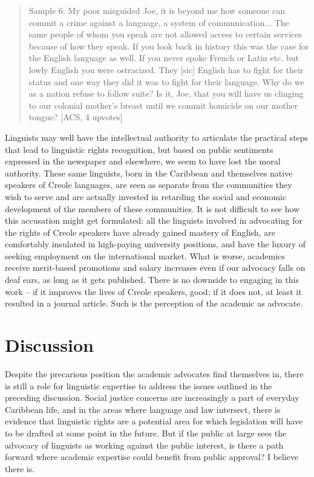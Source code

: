 \documentclass[output=paper,colorlinks,citecolor=brown]{langscibook}
\begin{document}
\begin{quote}
    Sample 6: My poor misguided Joe, it is beyond me how someone can commit a crime against a language, a system of communication... The same people of whom you speak are not allowed access to certain services because of how they speak. If you look back in history this was the case for the English language as well. If you never spoke French or Latin etc. but lowly English you were ostracized. They [sic] English has to fight for their status and one way they did it was to fight for their language. Why do we as a nation refuse to follow suite? Is it, Joe, that you will have us clinging to our colonial mother’s breast until we commit homicide on our mother tongue? [ACS, 4 upvotes]
\end{quote}

Linguists may well have the intellectual authority to articulate the practical steps that lead to linguistic rights recognition, but based on public sentiments expressed in the newspaper and elsewhere, we seem to have lost the moral authority. These same linguists, born in the Caribbean and themselves native speakers of Creole languages, are seen as separate from the communities they wish to serve and are actually invested in retarding the social and economic development of the members of these communities. It is not difficult to see how this accusation might get formulated: all the linguists involved in advocating for the rights of Creole speakers have already gained mastery of English, are comfortably insulated in high-paying university positions, and have the luxury of seeking employment on the international market. What is worse, academics receive merit-based promotions and salary increases even if our advocacy falls on deaf ears, as long as it gets published. There is no downside to engaging in this work -- if it improves the lives of Creole speakers, good; if it does not, at least it resulted in a journal article. Such is the perception of the academic as advocate. 


\section{Discussion}

Despite the precarious position the academic advocates find themselves in, there is still a role for linguistic expertise to address the issues outlined in the preceding discussion. Social justice concerns are increasingly a part of everyday Caribbean life, and in the areas where language and law intersect, there is evidence that linguistic rights are a potential area for which legislation will have to be drafted at some point in the future. But if the public at large sees the advocacy of linguists as working against the public interest, is there a path forward where academic expertise could benefit from public approval? I believe there is. 
\end{document}
